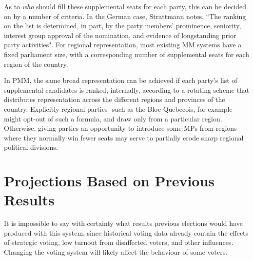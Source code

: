 As to \emph{who} should fill these supplemental seats for each party, this can be decided on by a number of criteria. 
In the German case, Strattmann notes\cite{Stratmann}, ``The ranking on the list is determined, in part, by the party members' prominence, seniority, interest group approval of the nomination, and evidence of longstanding prior party activities". 
For regional representation, most existing MM systems have a fixed parliament size, with a corresponding number of supplemental seats for each region of the country. 

In PMM, the same broad representation can be achieved if each party's list of supplemental candidates is ranked, internally, according to a rotating scheme that distributes representation across the different regions and provinces of the country. 
Explicitly regional parties \--such as the Bloc Quebecois, for example\-- might opt-out of such a formula, and draw only from a particular region. 
Otherwise, giving parties an opportunity to introduce some MPs from regions where they normally win fewer seats may serve to partially erode sharp regional political divisions.


\section{Projections Based on Previous Results}
\label{sec:projections}

It is impossible to say with certainty what results previous elections would have produced with this system, since historical voting data already contain the effects of strategic voting, low turnout from disaffected voters, and other influences. Changing the voting system will likely affect the behaviour of some voters.

